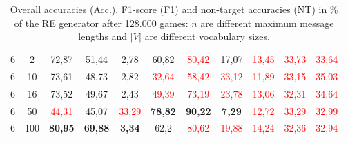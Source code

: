 \begin{table}[ht]
\begin{tabular}{cc|ccc|ccc|ccc}
        {6}                           & {2}    & {72,87}                             & {51,44}                             & {2,78}                                   & {60,82}                & \textcolor{red}{80,42} & {17,07}                & \textcolor{red}{13,45} & \textcolor{red}{33,73} & \textcolor{red}{33,64} \\
        {6}                           & {10}   & {73,61}                             & {48,73}                             & {2,82}                                   & \textcolor{red}{32,64} & \textcolor{red}{58,42} & \textcolor{red}{33,12} & \textcolor{red}{11,89} & \textcolor{red}{33,15} & \textcolor{red}{35,03} \\
        {6}                           & {16}   & {73,52}                             & {49,67}                             & {2,43}                                   & \textcolor{red}{49,39} & \textcolor{red}{73,19} & \textcolor{red}{23,78} & \textcolor{red}{13,06} & \textcolor{red}{32,31} & \textcolor{red}{34,64} \\
        {6}                           & {50}   & \textcolor{red}{44,31}              & {45,07}                             & \textcolor{red}{33,29}                   & {\textbf{78,82}}       & {\textbf{90,22}}       & {\textbf{7,29}}        & \textcolor{red}{12,72} & \textcolor{red}{33,29} & \textcolor{red}{32,99} \\
        {6}                           & {100}  & {\textbf{80,95}}                    & {\textbf{69,88}}                    & {\textbf{3,34}}                          & {62,2}                 & \textcolor{red}{80,62} & \textcolor{red}{19,88} & \textcolor{red}{14,24} & \textcolor{red}{32,36} & \textcolor{red}{32,94} \\
        \bottomrule
    \end{tabular}
    \caption{Overall accuracies (Acc.), F1-score (F1) and non-target accuracies (NT) in \% of the RE generator after 128.000 games: $n$ are different maximum message lengths and $|V|$ are different vocabulary sizes.}
    \label{tab:results:re-generator-game}
\end{table}

